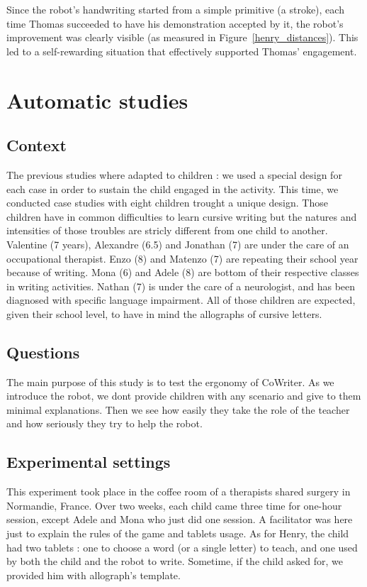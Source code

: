 \documentclass{sig-alternate}
\begin{document}
Since the robot's handwriting started from a simple primitive (a stroke), each
time Thomas succeeded to have his demonstration accepted by it, the robot's
improvement was clearly visible (as measured in Figure~\ref{henry_distances}).
This led to a self-rewarding situation that effectively supported Thomas'
engagement.

\section{Automatic studies}

\subsection{Context}

The previous studies where adapted to children : we used a special
design for each case in order to sustain the child engaged in the activity.
This time, we conducted case studies with eight children trought a unique
design. Those children have in common difficulties to learn
cursive writing but the natures and intensities of those troubles are stricly
different from one child to another. Valentine (7 years), Alexandre (6.5) and
Jonathan (7) are under the care of an
occupational therapist. Enzo (8) and Matenzo (7) are repeating their school year
because of writing. Mona (6) and Adele (8) are bottom of their respective
classes in writing activities. Nathan (7) is under the care of a neurologist, and
has been diagnosed with specific language impairment. All of those children are
expected, given their school level, to have in mind the allographs of
cursive letters. 

\subsection{Questions}

The main purpose of this study is to test the ergonomy of CoWriter. As we
introduce the robot, we dont
provide children with any scenario and give to them minimal explanations. Then
we see how easily they take the role of the teacher and how seriously they try to help the robot.

\subsection{Experimental settings}

This experiment took place in the coffee room of a therapists shared surgery
in Normandie, France. Over two weeks, each child came three time for one-hour
session, except Adele and Mona who just did one session. A facilitator was here
just to explain the rules of the game and tablets usage. As for Henry, the child
had two tablets : one to choose a word (or a single letter) to teach, and one
used by both the child and the robot to write. Sometime, if the child asked for,
we provided him with allograph's template. 
\end{document}
